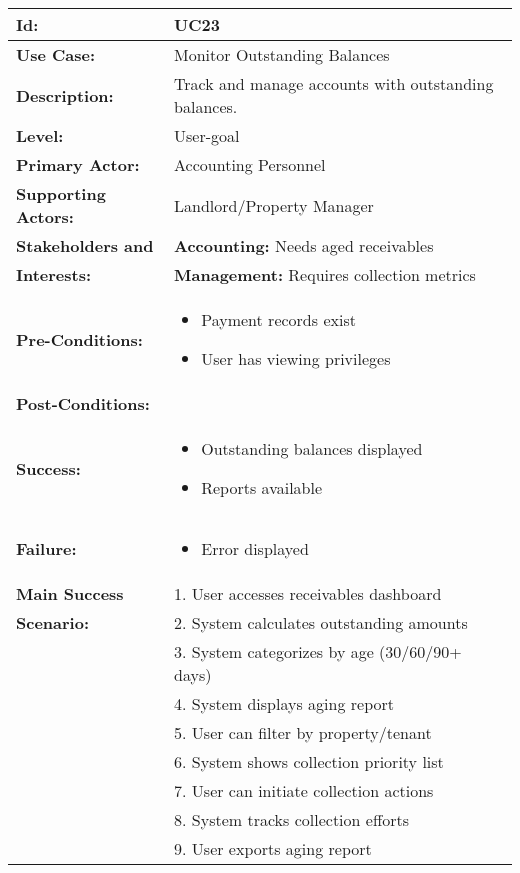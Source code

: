 \documentclass[12pt]{article}
\begin{document}
\begin{tabular}{|p{3cm}|p{11cm}|}
\hline
\textbf{Id:} & UC23 \\
\hline
\textbf{Use Case:} & Monitor Outstanding Balances \\
\hline
\textbf{Description:} & Track and manage accounts with outstanding balances. \\
\hline
\textbf{Level:} & User-goal \\
\hline
\textbf{Primary Actor:} & Accounting Personnel \\
\hline
\textbf{Supporting Actors:} & Landlord/Property Manager \\
\hline
\textbf{Stakeholders and} & \textbf{Accounting:} Needs aged receivables \\
\textbf{Interests:} & \textbf{Management:} Requires collection metrics \\
\hline
\textbf{Pre-Conditions:} & 
\begin{itemize}
    \item Payment records exist
    \item User has viewing privileges
\end{itemize} \\
\hline
\textbf{Post-Conditions:} & \\
\textbf{Success:} & 
\begin{itemize}
    \item Outstanding balances displayed
    \item Reports available
\end{itemize} \\
\textbf{Failure:} & 
\begin{itemize}
    \item Error displayed
\end{itemize} \\
\hline
\textbf{Main Success} & 1. User accesses receivables dashboard \\
\textbf{Scenario:} & 2. System calculates outstanding amounts \\
& 3. System categorizes by age (30/60/90+ days) \\
& 4. System displays aging report \\
& 5. User can filter by property/tenant \\
& 6. System shows collection priority list \\
& 7. User can initiate collection actions \\
& 8. System tracks collection efforts \\
& 9. User exports aging report \\

\end{tabular}
\end{document}
